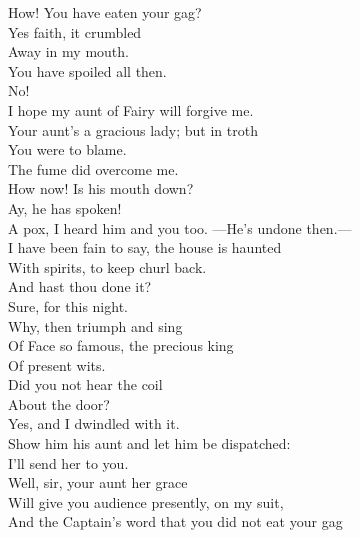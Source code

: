 \documentclass[a4paper,oneside,12pt]{memoir}
\begin{document}
\begin{drama*}
\subtlespeaks How! You have eaten your gag?\\
\dapperspeaks {} Yes faith, it crumbled\\
Away in my mouth.\\
\subtlespeaks {} You have spoiled all then.\\
\dapperspeaks {} No!\\
I hope my aunt of Fairy will forgive me.\\
\subtlespeaks Your aunt's a gracious lady; but in troth\\
You were to blame.\\
\dapperspeaks {} The fume did overcome me.\\
\facespeaks How now! Is his mouth down?\\
\subtlespeaks {} Ay, he has spoken!\\
\facespeaks A pox, I heard him and you too. ---He's undone then.---\\
I have been fain to say, the house is haunted\\
With spirits, to keep churl back.\\
\subtlespeaks {} And hast thou done it?\\
\facespeaks Sure, for this night.\\
\subtlespeaks {} Why, then triumph and sing\\
Of Face so famous, the precious king\\
Of present wits.\\
\facespeaks {} Did you not hear the coil\\
About the door?\\
\subtlespeaks {} Yes, and I dwindled with it.\\
\facespeaks Show him his aunt and let him be dispatched:\\
I'll send her to you.\\
\subtlespeaks {} Well, sir, your aunt her grace\\
Will give you audience presently, on my suit,\\
And the Captain's word that you did not eat your gag\\

\end{drama*}
\end{document}
